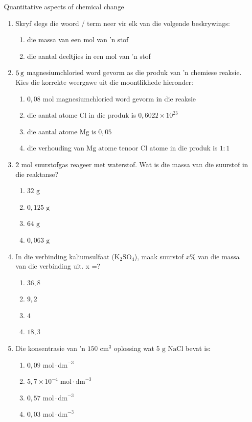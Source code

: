             \begin{eocexercises}{Quantitative aspects of chemical change}
            \nopagebreak \noindent
\begin{enumerate}[noitemsep, label=\textbf{\arabic*}. ] 
\item Skryf slegs die woord / term neer vir elk van die volgende beskrywings:
 \begin{enumerate}[noitemsep, label=\textbf{\alph*}. ] 
 \item die massa van een mol van 'n stof
 \item die aantal deeltjies in een mol van 'n stof
\end{enumerate}
 \item $5\phantom{\rule{2pt}{0ex}}\text{g}$ magnesiumchloried word gevorm as die produk van 'n chemiese reaksie.  Kies die korrekte weergawe uit die moontlikhede hieronder:
  \begin{enumerate}[noitemsep, label=\textbf{\alph*}. ] 
  \item $0,08$ mol magnesiumchloried word gevorm in die reaksie
  \item die aantal atome $\text{Cl}$ in die produk is $0,6022\ensuremath{\times}{10}^{23}$
  \item die aantal atome $\text{Mg}$ is $0,05$
  \item die verhouding van $\text{Mg}$ atome tenoor $\text{Cl}$ atome in die produk is $1:1$
  \end{enumerate}
 \item 2 mol suurstofgas reageer met waterstof. Wat is die massa van die suurstof in die reaktanse?
  \begin{enumerate}[noitemsep, label=\textbf{\alph*}. ]
  \item $32 \text{ g}$
  \item $0,125 \text{ g}$
  \item $64 \text{ g}$
  \item $0,063 \text{ g}$
  \end{enumerate}
 \item In die verbinding kaliumsulfaat ($\text{K}{}_{2}\text{SO}{}_{4}$), maak suurstof  $x\%$ van die massa van die verbinding uit. x =?
  \begin{enumerate}[noitemsep, label=\textbf{\alph*}. ]
  \item $36,8$
  \item $9,2$
  \item $4$
  \item $18,3$
  \end{enumerate}
 \item Die konsentrasie van 'n $150 {\text{ cm}}^{3}$ oplossing wat $5 \text{ g}$ $\text{NaCl}$ bevat is:
  \begin{enumerate}[noitemsep, label=\textbf{\alph*}. ]
  \item $0,09 \text{ mol} \cdot \text{dm}^{-3}$
  \item $5,7 \times 10^{-4} \text{ mol} \cdot \text{dm}^{-3}$
  \item $0,57 \text{ mol} \cdot \text{dm}^{-3}$
  \item $0,03 \text{ mol} \cdot \text{dm}^{-3}$
  \end{enumerate}


\end{enumerate}
\end{eocexercises}
